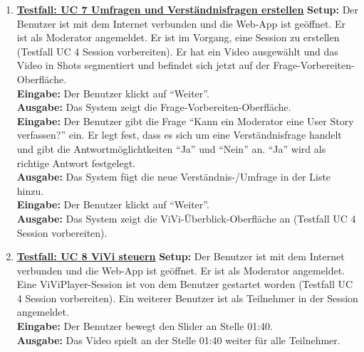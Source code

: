 \begin{enumerate}
	\item \underline{\textbf{Testfall: UC 7 Umfragen und Verständnisfragen erstellen}} \linebreak
	\textbf{Setup:} Der Benutzer ist mit dem Internet verbunden und die Web-App ist geöffnet. Er ist als Moderator angemeldet. Er ist im Vorgang, eine Session zu erstellen (Testfall UC 4 Session vorbereiten). Er hat ein Video ausgewählt und das Video in Shots segmentiert und befindet sich jetzt auf der Frage-Vorbereiten-Oberfläche.\\
	\textbf{Eingabe:} Der Benutzer klickt auf ``Weiter''. \\
	\textbf{Ausgabe:} Das System zeigt die Frage-Vorbereiten-Oberfläche.\\ 
	\textbf{Eingabe:} Der Benutzer gibt die Frage ``Kann ein Moderator eine User Story verfassen?'' ein. Er legt fest, dass es sich um eine Verständnisfrage handelt und gibt die Antwortmöglichtkeiten ``Ja'' und ``Nein'' an. ``Ja'' wird als richtige Antwort festgelegt.\\
	\textbf{Ausgabe:} Das System fügt die neue Verständnis-/Umfrage in der Liste hinzu. \\
	\textbf{Eingabe:} Der Benutzer klickt auf ``Weiter''.\\
	\textbf{Ausgabe:} Das System zeigt die ViVi-Überblick-Oberfläche an (Testfall UC 4 Session vorbereiten).

	\item \underline{\textbf{Testfall: UC 8 ViVi steuern}} \linebreak
	\textbf{Setup:} Der Benutzer ist mit dem Internet verbunden und die Web-App ist geöffnet. Er ist als Moderator angemeldet. Eine ViViPlayer-Session ist von dem Benutzer gestartet worden (Testfall UC 4 Session vorbereiten). Ein weiterer Benutzer ist als Teilnehmer in der Session angemeldet. \\
	\textbf{Eingabe:} Der Benutzer bewegt den Slider an Stelle 01:40. \\
	\textbf{Ausgabe:} Das Video spielt an der Stelle 01:40 weiter für alle Teilnehmer.\\
	

\end{enumerate}
